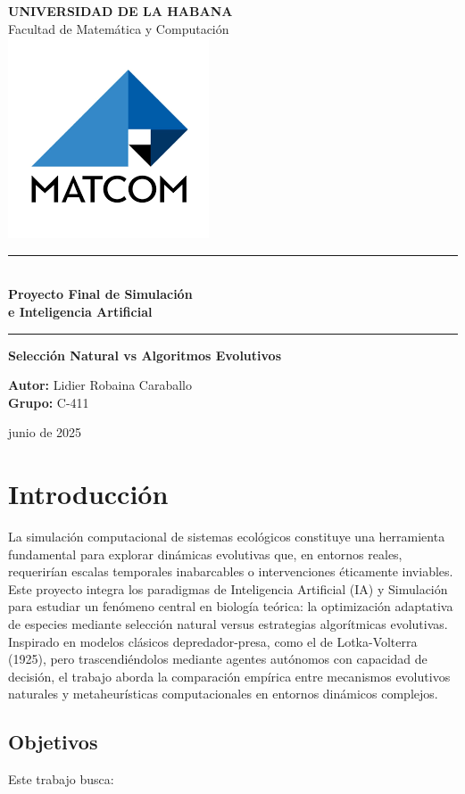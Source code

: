\documentclass[letterpaper, 12pt]{report}
\newcommand*{\customtitlepage}{
    \begin{titlepage}
        \begin{center}
            \vspace*{1cm}
            
            
            {\LARGE \textbf{UNIVERSIDAD DE LA HABANA}}\\
            \vspace{0.5cm}
            {\Large Facultad de Matem\'atica y Computaci\'on}\\
            

            \includegraphics[scale=0.5]{images/logo.png}
            
            \vspace{1cm}
            
            
            \rule{\textwidth}{1.5pt}\\
            \vspace{0.5cm}
            {\LARGE \textcolor{primary}{\textbf{Proyecto Final de Simulación \\ \vspace{0.3cm} e Inteligencia Artificial}}}
            \vspace{0.5cm}
            \rule{\textwidth}{1.5pt}
            
            \vspace{2cm}
            
            {\Large \textbf{Selección Natural vs Algoritmos Evolutivos}}\\
            \vspace{1cm}
            
            {\Large \textbf{Autor:} Lidier Robaina Caraballo \\
            \vspace{0.5cm}
            {\Large \textbf{Grupo:} C-411 }\\
            \vspace{1.5cm}
            
            {\Large junio de 2025
            }
            }
        \end{center}
    \end{titlepage}
}
\begin{document}
\customtitlepage

\tableofcontents
\thispagestyle{empty}
\cleardoublepage

\setcounter{page}{1}

\chapter{Introducción}


La simulación computacional de sistemas ecológicos constituye una herramienta fundamental para explorar dinámicas evolutivas que, en entornos reales, requerirían escalas temporales inabarcables o intervenciones éticamente inviables. Este proyecto integra los paradigmas de Inteligencia Artificial (IA) y Simulación para estudiar un fenómeno central en biología teórica: la optimización adaptativa de especies mediante selección natural versus estrategias algorítmicas evolutivas. Inspirado en modelos clásicos depredador-presa, como el de Lotka-Volterra (1925), pero trascendiéndolos mediante agentes autónomos con capacidad de decisión, el trabajo aborda la comparación empírica entre mecanismos evolutivos naturales y metaheurísticas computacionales en entornos dinámicos complejos.

\section{Objetivos}

Este trabajo busca:
\end{document}
